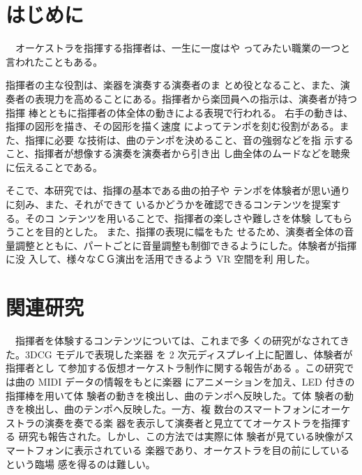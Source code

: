 \documentclass[uplatex]{jsarticle}   %
\begin{document}

\vspace{3mm}




\section{はじめに}
　オーケストラを指揮する指揮者は、一生に一度はや ってみたい職業の一つと言われたこともある。

指揮者の主な役割は、楽器を演奏する演奏者のま とめ役となること、また、演奏者の表現力を高めることにある。指揮者から楽団員への指示は、演奏者が持つ指揮 棒とともに指揮者の体全体の動きによる表現で行われる。 右手の動きは、指揮の図形を描き、その図形を描く速度 によってテンポを刻む役割がある。また、指揮に必要 な技術は、曲のテンポを決めること、音の強弱などを指 示すること、指揮者が想像する演奏を演奏者から引き出 し曲全体のムードなどを聴衆に伝えることである。

そこで、本研究では、指揮の基本である曲の拍子や テンポを体験者が思い通りに刻み、また、それができて いるかどうかを確認できるコンテンツを提案する。そのコ ンテンツを用いることで、指揮者の楽しさや難しさを体験 してもらうことを目的とした。
また、指揮の表現に幅をもた せるため、演奏者全体の音量調整とともに、パートごとに音量調整も制御できるようにした。体験者が指揮に没 入して、様々なＣＧ演出を活用できるよう VR 空間を利 用した。

\section{関連研究}
　指揮者を体験するコンテンツについては、これまで多 くの研究がなされてきた。3DCG モデルで表現した楽器 を 2 次元ディスプレイ上に配置し、体験者が指揮者とし て参加する仮想オーケストラ制作に関する報告がある 。この研究では曲の MIDI データの情報をもとに楽器 にアニメーションを加え、LED 付きの指揮棒を用いて体 験者の動きを検出し、曲のテンポへ反映した。て体 験者の動きを検出し、曲のテンポへ反映した。一方、複 数台のスマートフォンにオーケストラの演奏を奏でる楽 器を表示して演奏者と見立ててオーケストラを指揮する 研究も報告された。しかし、この方法では実際に体 験者が見ている映像がスマートフォンに表示されている 楽器であり、オーケストラを目の前にしているという臨場 感を得るのは難しい。
\end{document}
